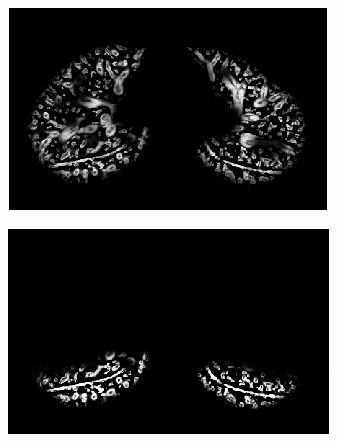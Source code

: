 {\begin{figure}[htbp]
\begin{subfigure}{.408\linewidth}
  \includegraphics[width=\linewidth,trim={{.0\wd0} {.0\wd0} {.0\wd0} {.0\wd0}},clip]{Segmentation/Image/FissureDetection2.jpg}
  \caption{}
	\label{fig:FissureDetection-b}
\end{subfigure}
\begin{subfigure}{.4\linewidth}%
  \includegraphics[width=\linewidth,trim={{.0\wd0} {.0\wd0} {.0\wd0} {.0\wd0}},clip]{Segmentation/Image/FissureDetection3.jpg}

\end{subfigure}
\end{figure}}
